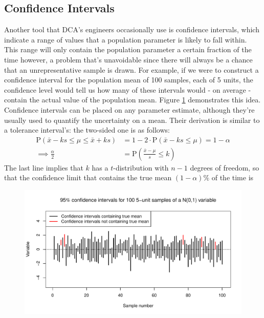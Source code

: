 \documentclass[11pt,a4paper,article]{memoir} %
\begin{document}
\subsection*{Confidence Intervals}
Another tool that DCA's engineers occasionally use is confidence intervals, which indicate a range of values that a population parameter is likely to fall within. This range will only contain the population parameter a certain fraction of the time however, a problem that's unavoidable since there will always be a chance that an unrepresentative sample is drawn. For example, if we were to construct a confidence interval for the population mean of 100 samples, each of 5 units, the confidence level would tell us how many of these intervals would - on average - contain the actual value of the population mean. Figure \ref{fig:confidence_intervals} demonstrates this idea. Confidence intervals can be placed on any parameter estimate, although they're usually used to quantify the uncertainty on a mean. Their derivation is similar to a tolerance interval's: the two-sided one is as follows:
\begin{align}
	\text{P}(\bar{x} - ks \leq \mu \leq \bar{x} + ks) &= 1 - 2\cdot \text{P}(\bar{x} - ks \leq \mu) = 1 - \alpha \nonumber\\
	\implies \frac{\alpha}{2} &= \text{P}(\frac{\bar{x} - \mu}{s} \leq k) 
\end{align}
The last line implies that $k$ has a $t$-distribution with $n - 1$ degrees of freedom, so that the confidence limit that contains the true mean $(1 - \alpha)\%$ of the time is
\begin{equation}
	[\bar{x} - t_{n-1}(\alpha)\cdot s, \ \bar{x} + t_{n-1}(\alpha)\cdot s]
\end{equation}
\begin{figure}[H]
\includegraphics[width=\textwidth]{confidence_intervals.pdf}
\caption{}
\label{fig:confidence_intervals}
\end{figure}
\end{document}
